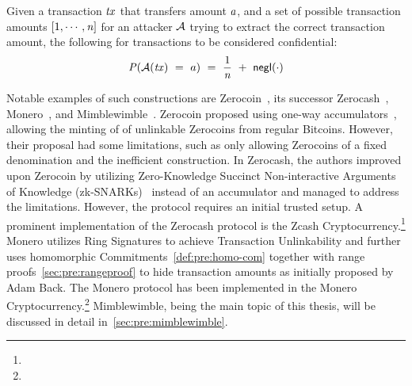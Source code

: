 \begin{definition} \label{def:pre:privacy:conf-tx}
    Given a transaction $\mathit{tx}$ that transfers amount $a$, and a set of possible transaction amounts $[1,\cdots,\mathit{n}]$ for an attacker $\mathcal{A}$ trying to extract the correct transaction amount, the following for transactions to be considered confidential: 
    \[ \mathit{P}(\mathcal{A}(\mathit{tx}) ~=~ a) ~=~ \frac{1}{\mathit{n}} ~+~ \mathsf{negl}(\cdot) \]
\end{definition}


Notable examples of such constructions are Zerocoin~\cite{miers2013zerocoin},  its successor Zerocash~\cite{sasson2014zerocash}, Monero~\cite{noether2015ring}, and Mimblewimble~\cite{jedusor2016mimblewimble}.
Zerocoin proposed using one-way accumulators~\cite{benaloh1993one}, allowing the minting of of unlinkable Zerocoins from regular Bitcoins.
However, their proposal had some limitations, such as only allowing Zerocoins of a fixed denomination and the inefficient construction.
In Zerocash, the authors improved upon Zerocoin by utilizing Zero-Knowledge Succinct Non-interactive Arguments of Knowledge (zk-SNARKs)~\cite{bitansky2012extractable} instead of an accumulator and managed to address the limitations.
However, the protocol requires an initial trusted setup.
A prominent implementation of the Zerocash protocol is the Zcash Cryptocurrency.\footnote{\urlzcash}
Monero utilizes Ring Signatures to achieve Transaction Unlinkability and further uses homomorphic Commitments~\cref{def:pre:homo-com} together with range proofs~\cref{sec:pre:rangeproof}  to hide transaction amounts as initially proposed by Adam Back.
The Monero protocol has been implemented in the Monero Cryptocurrency.\footnote{\urlmonero}
Mimblewimble, being the main topic of this thesis, will be discussed in detail in~\cref{sec:pre:mimblewimble}.

